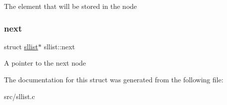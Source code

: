 The element that will be stored in the node \mbox{\label{structsllist_abd84069b1b074a7ac7d94b65672d4fd3}} 
\subsubsection{\texorpdfstring{next}{next}}
{\footnotesize\ttfamily struct \hyperlink{structsllist}{sllist}$\ast$ sllist\+::next}

A pointer to the next node 

The documentation for this struct was generated from the following file\+:\begin{DoxyCompactItemize}
\item 
src/sllist.\+c\end{DoxyCompactItemize}
